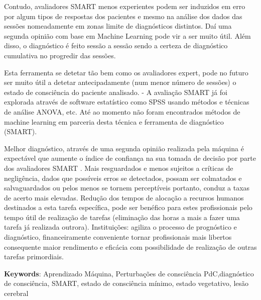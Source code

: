 Contudo, avaliadores SMART menos experientes podem ser induzidos em erro por algum tipos de respostas dos pacientes e mesmo na análise dos dados das sessões nomeadamente em zonas limite de diagnósticos distintos. 
Daí uma segunda opinião com base em Machine Learning pode vir a ser muito útil. Além disso, o diagnóstico é feito sessão a sessão sendo a certeza de diagnóstico cumulativa no progredir das sessões.

Esta ferramenta se detetar tão bem como os avaliadores expert, pode no futuro ser muito útil a detetar antecipadamente (num menor número de sessões) o estado de consciência do paciente analisado.
- A avaliação SMART já foi explorada através de software estatístico como SPSS usando métodos e técnicas de análise ANOVA, etc.
Até ao momento  não foram encontrados  métodos de machine learning em parceria desta técnica e ferramenta de diagnóstico (SMART).  
 
  Melhor diagnóstico, através de uma segunda opinião realizada pela máquina é expectável que aumente o índice de confiança na sua tomada de decisão por parte dos avaliadores SMART . Mais resguardados e menos sujeitos a críticas de negligência, dados que possíveis erros se detectados, possam ser colmatados e salvaguardados ou pelos menos se tornem perceptíveis portanto, conduz a taxas de acerto mais elevadas. Redução dos tempos de alocação a recursos humanos destinados a esta tarefa específica, pode ser benéfico para estes profissionais pelo tempo útil de realização de tarefas (eliminação das horas a mais a fazer uma tarefa já realizada outrora). 
Instituições: agiliza o processo de prognóstico e diagnóstico, financeiramente conveniente tornar profissionais mais libertos consequente maior rendimento e eficácia com possibilidade de realização de outras tarefas primordiais.

\vspace*{10mm}\noindent
\textbf{Keywords}: Aprendizado Máquina, Perturbações de consciência PdC,diagnóstico de consciência, SMART, estado de consciência mínimo, estado vegetativo, lesão cerebral
